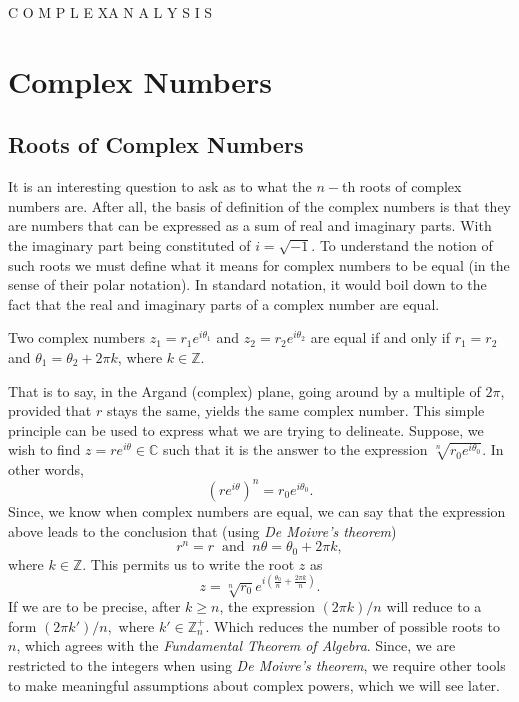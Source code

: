 \documentclass[12pt]{book}
\begin{document}
    \begin{titlingpage}
        \maketitle
        \vspace{-50pt}
        \begin{center}
            \Large C O M P L E X\;\;A N A L Y S I S 
        \end{center}
    \end{titlingpage}

\tableofcontents

\chapter{Complex Numbers}
\section{Roots of Complex Numbers}
It is an interesting question to ask as to what the $n-$th roots of complex numbers are. After all, the basis of definition of the complex numbers is that they are numbers that can be expressed as a sum of real and imaginary parts. With the imaginary part being constituted of $i = \sqrt{-1}.$ To understand the notion of such roots we must define what it means for complex numbers to be equal (in the sense of their polar notation). In standard notation, it would boil down to the fact that the real and imaginary parts of a complex number are equal.

\begin{defn}
    Two complex numbers $z_1 = r_1e^{i\theta_{1}}$ and $z_2 = r_2e^{i\theta_{2}}$ are equal if and only if $r_1 = r_2$ and $\theta_{1} = \theta_{2} + 2\pi k$, where $k \in \mathbb{Z}$.
\end{defn}

That is to say, in the Argand (complex) plane, going around by a multiple of $2\pi$, provided that $r$ stays the same, yields the same complex number. This simple principle can be used to express what we are trying to delineate. Suppose, we wish to find $z = r e^{i\theta} \in \mathbb{C}$ such that it is the answer to the expression $\sqrt[n]{r_0 e^{i\theta_{0}}}.$ In other words,
\[
    (r e^{i\theta})^{n} = r_0 e^{i\theta_{0}}.
\]  
Since, we know when complex numbers are equal, we can say that the expression above leads to the conclusion that (using \textit{De Moivre's theorem})
\[
    r^{n} = r\;\;\text{and}\;\; n\theta = \theta_{0} + 2\pi k,
\]
where $k \in \mathbb{Z}.$ This permits us to write the root $z$ as 
\[
    z = \sqrt[n]{r_0} e^{i\left(\frac{\theta_{0}}{n} + \frac{2\pi k}{n}\right)}.
\]
If we are to be precise, after $k \geq n$, the expression $(2\pi k) / n$ will reduce to a form $(2 \pi k') /n,$ where $k' \in \mathbb{Z}^{+}_{n}.$ Which reduces the number of possible roots to $n$, which agrees with the \textit{Fundamental Theorem of Algebra}. Since, we are restricted to the integers when using \textit{De Moivre's theorem}, we require other tools to make meaningful assumptions about complex powers, which we will see later.
\end{document}
